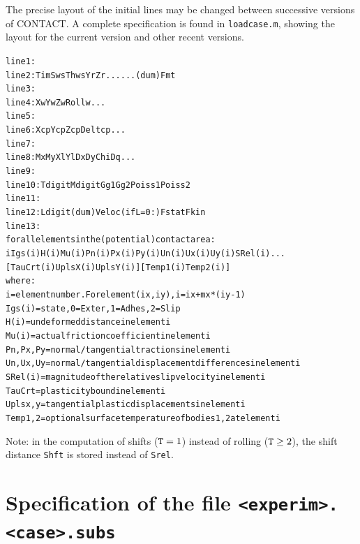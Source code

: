 \documentclass[12pt]{report}
\begin{document}
The precise layout of the initial lines may be changed between successive
versions of CONTACT. A complete specification is found in {\tt loadcase.m},
showing the layout for the current version and other recent versions.
\begin{alltt}\small
 line  1: %
 line  2:   Tim   Sws   Thws  Yr    Zr      ...         ...   (dum)  Fmt
 line  3: %
 line  4:   Xw    Yw    Zw    Rollw   ...
 line  5: %
 line  6:   Xcp   Ycp   Zcp   Deltcp  ...
 line  7: %
 line  8:   Mx    My    Xl    Yl    Dx    Dy   Chi   Dq  ...
 line  9: %
 line 10:   Tdigit Mdigit Gg1    Gg2    Poiss1 Poiss2
 line 11: %
 line 12:   Ldigit  (dum)  Veloc  (if L=0:) Fstat  Fkin
 line 13: %
 for all elements in the (potential) contact area:
   i  Igs(i)  H(i)  Mu(i)  Pn(i)  Px(i)  Py(i)  Un(i)  Ux(i)  Uy(i)  SRel(i) ...
                            [ TauCrt(i) UplsX(i) UplsY(i) ] [ Temp1(i) Temp2(i)]
 where:
   i        = element number. For element (ix,iy), i = ix + mx*(iy-1)
   Igs(i)   = state, 0=Exter, 1=Adhes, 2=Slip
   H(i)     = undeformed distance in element i
   Mu(i)    = actual friction coefficient in element i
   Pn,Px,Py = normal/tangential tractions in element i
   Un,Ux,Uy = normal/tangential displacement differences in element i
   SRel(i)  = magnitude of the relative slip velocity in element i
   TauCrt   = plasticity bound in element i
   Uplsx,y  = tangential plastic displacements in element i
   Temp1,2  = optional surface temperature of bodies 1, 2 at element i
\end{alltt}
Note: in the computation of shifts (${\tt T}=1$) instead of rolling
(${\tt T}\ge 2$), the shift distance {\tt Shft} is stored instead of
{\tt Srel}.

\section{Specification of the file {\tt <experim>.<case>.subs}}
\label{sec:spec_subs}
\end{document}
